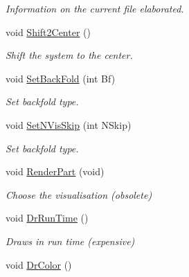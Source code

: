 \begin{DoxyCompactItemize}
\begin{DoxyCompactList}\small\item\em Information on the current file elaborated. \end{DoxyCompactList}\item 
void \hyperlink{classElPoly_a2d5b51a7f120a4104f6e5070ca6c55f5}{Shift2\+Center} ()\hypertarget{classElPoly_a2d5b51a7f120a4104f6e5070ca6c55f5}{}\label{classElPoly_a2d5b51a7f120a4104f6e5070ca6c55f5}

\begin{DoxyCompactList}\small\item\em Shift the system to the center. \end{DoxyCompactList}\item 
void \hyperlink{classElPoly_adf3c4c944496227c17ceebc8d42d5ea5}{Set\+Back\+Fold} (int Bf)\hypertarget{classElPoly_adf3c4c944496227c17ceebc8d42d5ea5}{}\label{classElPoly_adf3c4c944496227c17ceebc8d42d5ea5}

\begin{DoxyCompactList}\small\item\em Set backfold type. \end{DoxyCompactList}\item 
void \hyperlink{classElPoly_a0312cac4bd3e684fef174d0147607a1c}{Set\+N\+Vis\+Skip} (int N\+Skip)\hypertarget{classElPoly_a0312cac4bd3e684fef174d0147607a1c}{}\label{classElPoly_a0312cac4bd3e684fef174d0147607a1c}

\begin{DoxyCompactList}\small\item\em Set backfold type. \end{DoxyCompactList}\item 
void \hyperlink{classElPoly_a6387005443a530d1a66a0833c72b23fd}{Render\+Part} (void)\hypertarget{classElPoly_a6387005443a530d1a66a0833c72b23fd}{}\label{classElPoly_a6387005443a530d1a66a0833c72b23fd}

\begin{DoxyCompactList}\small\item\em Choose the visualisation (obsolete) \end{DoxyCompactList}\item 
void \hyperlink{classElPoly_a28d17ecbad071d90ae8b571f068d865a}{Dr\+Run\+Time} ()\hypertarget{classElPoly_a28d17ecbad071d90ae8b571f068d865a}{}\label{classElPoly_a28d17ecbad071d90ae8b571f068d865a}

\begin{DoxyCompactList}\small\item\em Draws in run time (expensive) \end{DoxyCompactList}\item 
void \hyperlink{classElPoly_aef35a22a4138fad89d7329d9fd49d97e}{Dr\+Color} ()\hypertarget{classElPoly_aef35a22a4138fad89d7329d9fd49d97e}{}\label{classElPoly_aef35a22a4138fad89d7329d9fd49d97e}


\end{DoxyCompactItemize}
